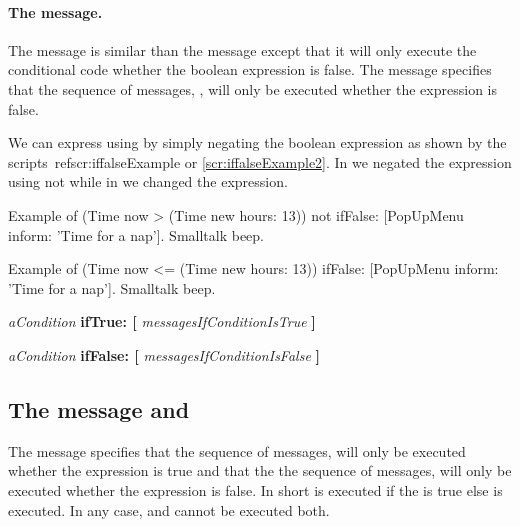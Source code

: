 \paragraph{The message.} The message  is similar than the message  except that it will only execute the conditional code whether the boolean expression is false. 
The message  specifies that  the sequence of messages, , will only be executed whether the expression  is false. 

We can express  using  by simply negating the boolean expression 
as shown by the scripts~ref{scr:iffalseExample} or \ref{scr:iffalseExample2}. In  we negated the expression using not while in  we changed the expression. 

\begin{scriptwithtitle}{Example of }\label{scr:iffalseExample}
(Time now > (Time new hours: 13)) not
   ifFalse: [PopUpMenu inform: 'Time for a nap'].
Smalltalk beep. 
\end{scriptwithtitle}

\begin{scriptwithtitle}{Example of }\label{scr:iffalseExample2}
(Time now <= (Time new hours: 13)) 
   ifFalse: [PopUpMenu inform: 'Time for a nap'].
Smalltalk beep. 
\end{scriptwithtitle}


\begin{template}
\textit{aCondition}
   \textbf{ifTrue: [} \textit{messagesIfConditionIsTrue} \textbf{]}

\textit{aCondition}
   \textbf{ifFalse: [} \textit{messagesIfConditionIsFalse} \textbf{]}
\end{template}


\subsection{The message   and  }

The message  specifies that  the sequence of messages,  will only be executed whether the expression  is true and that the the sequence of messages,  will only be executed whether the expression  is false. In short  is executed if the  is true else  is executed. In any case,  and  cannot be executed both. 


